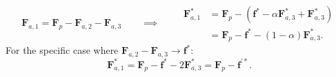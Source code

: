 \begin{equation}
    \mathbf F_{a,1} = \mathbf F_p - \mathbf F_{a,2} - \mathbf F_{a,3} \qquad \implies \qquad
    \begin{aligned}
        \mathbf F_{a,1}^* &= \mathbf F_p -
        \left(
            \mathbf f^* - \alpha\mathbf F_{a,3}^* + \mathbf F_{a,3}^*
        \right) \\
        &= \mathbf F_p - \mathbf f^* - (1-\alpha)\mathbf F_{a,3}^*.
    \end{aligned}
\end{equation}
For the specific case where $ \mathbf F_{a,2} - \mathbf F_{a,3} \xrightarrow{} \mathbf f^*$:
\begin{equation}
    \mathbf F_{a,1}^* = \mathbf F_p - \mathbf f^* - 2\mathbf F_{a,3}^* = \mathbf F_p - \mathbf f^{\prime *}.
\end{equation}